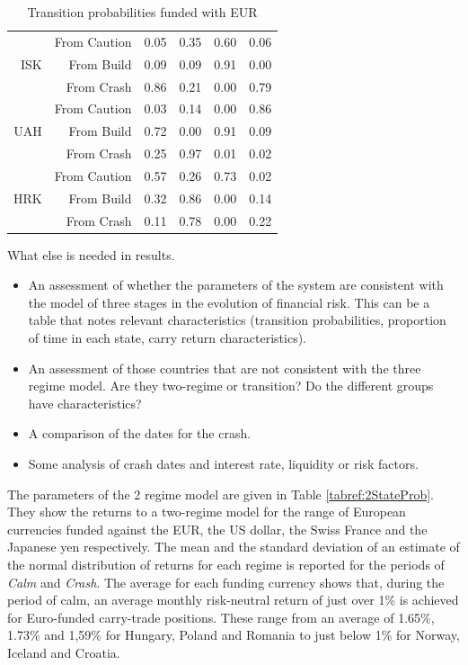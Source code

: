 \documentclass[12pt, a4paper, oneside]{article} %
\begin{document}
\begin{table}[!h]
\begin{tabular}{rrrrrr}
\hline
\multirow{3}{*}{ISK}   & From Caution & 0.05 & 0.35 & 0.60 & 0.06 \\ 
   & From Build & 0.09 & 0.09 & 0.91 & 0.00 \\ 
   & From Crash & 0.86 & 0.21 & 0.00 & 0.79 \\ 
\hline
\multirow{3}{*}{UAH} & From Caution & 0.03 & 0.14 & 0.00 & 0.86 \\ 
   & From Build & 0.72 & 0.00 & 0.91 & 0.09 \\ 
   & From Crash & 0.25 & 0.97 & 0.01 & 0.02 \\ 
\hline
\multirow{3}{*}{HRK}  & From Caution & 0.57 & 0.26 & 0.73 & 0.02 \\ 
   & From Build  & 0.32 & 0.86 & 0.00 & 0.14 \\ 
   & From Crash & 0.11 & 0.78 & 0.00 & 0.22 \\ 
   \hline
\end{tabular}
\caption{Transition probabilities funded with EUR}
\label{tabref:3statetrans}
\end{table}


What else is needed in results.
\begin{itemize}
\item An assessment of whether the parameters of the system are consistent with the model of three stages in the evolution of financial risk.  This can be a table that notes relevant characteristics (transition probabilities, proportion of time in each state, carry return characteristics). 
\item An assessment of those countries that are not consistent with the three regime model.  Are they two-regime or transition?  Do the different groups have characteristics? 
\item A comparison of the dates for the crash. 
\item Some analysis of crash dates and interest rate, liquidity or risk factors. 
\end{itemize}
 
  
The parameters of the 2 regime model are given in Table \ref{tabref:2StateProb}.  They show the returns to a two-regime model for the range of European currencies funded against the EUR, the US dollar, the Swiss France and the Japanese yen respectively.  The mean and the standard deviation of an estimate of the normal distribution of returns for each regime is reported for the periods of \emph{Calm} and \emph{Crash}.  The average for each funding currency shows that, during the period of calm, an average  monthly risk-neutral return of just over 1\% is achieved for Euro-funded carry-trade positions. These range from an average of 1.65\%, 1.73\% and 1,59\% for Hungary, Poland and Romania to just below 1\% for Norway, Iceland and Croatia. 
\end{document}
